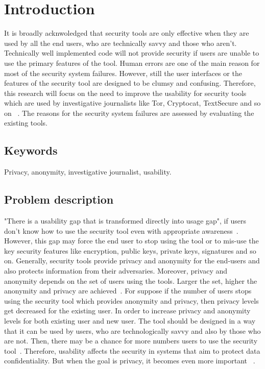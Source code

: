 \chapter{Introduction}
\label{chap:introduction}

It is broadly acknwoledged that security tools are only effective when they are used by all the end users, who are technically savvy and those who aren't. Technically well implemented code will not provide security if users are unable to use the primary features of the tool. Human errors are one of the main reason for most of the security system failures. However, still the user interfaces or the features of the security tool are designed to be clumsy and confusing. Therefore, this research will focus on the need to improve the usability for security tools which are used by investigative journalists like Tor, Cryptocat, TextSecure and so on ~\cite{wm4}. The reasons for the security system failures are assessed by evaluating the existing tools.
\section{Keywords}
Privacy, anonymity, investigative journalist, usability. 

\section{Problem description}\label{Problem:description}
"There is a usability gap that is transformed directly into usage gap", if users don't know how to use the security tool even with appropriate awareness~\cite{furnell2006challenges}. However, this gap may force the end user to stop using the tool or to mis-use the key security features like encryption, public keys, private keys, signatures and so on. Generally, security tools provide privacy and anonymity for the end-users and also protects information from their adversaries. Moreover, privacy and anonymity depends on the set of users using the tools. Larger the set, higher the anonymity and privacy are achieved~\cite{dingledine2006anonymity}. For suppose if the number of users stops using the security tool which provides anonymity and privacy, then privacy levels get decreased for the existing user.  In order to increase  privacy and anonymity levels for both  existing user and new user. The tool should be designed in a way that it can be used by users, who are technologically savvy and also by those who are not. Then, there may be a chance for more numbers users to use the security tool~\cite{pfitzmann2001anonymity}. Therefore, usability affects the security in systems that aim to protect data confidentiality. But when the goal is privacy, it becomes even more important ~\cite{dingledine2006anonymity}.

